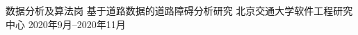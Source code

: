 

\begin{cventries}
	
	\cventrye
	{数据分析及算法岗} %
	{基于道路数据的道路障碍分析研究 \href{https://github.com/Tang1705/oppo-mi-car-pro}{{\color{awesome}\faGithub}}} %
	{北京交通大学软件工程研究中心} %
	{2020年9月--2020年11月} %
\end{cventries}
